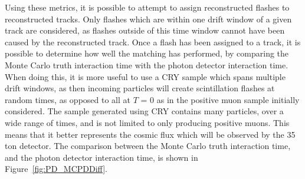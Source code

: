 Using these metrics, it is possible to attempt to assign reconstructed flashes to reconstructed tracks. Only flashes which are within one drift window of a given track are considered, as flashes outside of this time window cannot have been caused by the reconstructed track. Once a flash has been assigned to a track, it is possible to determine how well the matching has performed, by comparing the Monte Carlo truth interaction time with the photon detector interaction time. When doing this, it is more useful to use a CRY sample which spans multiple drift windows, as then incoming particles will create scintillation flashes at random times, as opposed to all at $T$ = 0 as in the positive muon sample initially considered. The sample generated using CRY contains many particles, over a wide range of times, and is not limited to only producing positive muons. This means that it better represents the cosmic flux which will be observed by the 35 ton detector. The comparison between the Monte Carlo truth interaction time, and the photon detector interaction time, is shown in Figure~\ref{fig:PD_MCPDDiff}. \\

